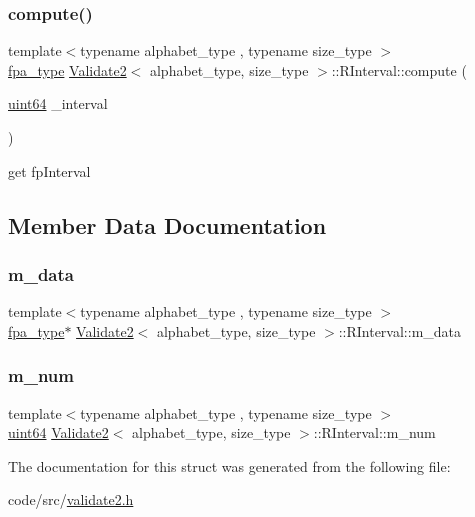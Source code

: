 \subsubsection{\texorpdfstring{compute()}{compute()}}
{\footnotesize\ttfamily template$<$typename alphabet\+\_\+type , typename size\+\_\+type $>$ \\
\hyperlink{common_8h_a7fdaf8b9b3d2f6ae6b10597a8d3f96ee}{fpa\+\_\+type} \hyperlink{class_validate2}{Validate2}$<$ alphabet\+\_\+type, size\+\_\+type $>$\+::R\+Interval\+::compute (\begin{DoxyParamCaption}\item[{\hyperlink{types_8h_a60e8696a4678cd348e991a1f172e53f7}{uint64}}]{\+\_\+interval }\end{DoxyParamCaption})\hspace{0.3cm}{\ttfamily [inline]}}



get fp\+Interval 



\subsection{Member Data Documentation}
\mbox{\label{struct_validate2_1_1_r_interval_aee05aa76b959338fd2d1c0833f2e35d7}} 
\subsubsection{\texorpdfstring{m\+\_\+data}{m\_data}}
{\footnotesize\ttfamily template$<$typename alphabet\+\_\+type , typename size\+\_\+type $>$ \\
\hyperlink{common_8h_a7fdaf8b9b3d2f6ae6b10597a8d3f96ee}{fpa\+\_\+type}$\ast$ \hyperlink{class_validate2}{Validate2}$<$ alphabet\+\_\+type, size\+\_\+type $>$\+::R\+Interval\+::m\+\_\+data}

\mbox{\label{struct_validate2_1_1_r_interval_ace46ef0a61dad6c184579e23bfae12ce}} 
\subsubsection{\texorpdfstring{m\+\_\+num}{m\_num}}
{\footnotesize\ttfamily template$<$typename alphabet\+\_\+type , typename size\+\_\+type $>$ \\
\hyperlink{types_8h_a60e8696a4678cd348e991a1f172e53f7}{uint64} \hyperlink{class_validate2}{Validate2}$<$ alphabet\+\_\+type, size\+\_\+type $>$\+::R\+Interval\+::m\+\_\+num}



The documentation for this struct was generated from the following file\+:\begin{DoxyCompactItemize}
\item 
code/src/\hyperlink{validate2_8h}{validate2.\+h}\end{DoxyCompactItemize}

